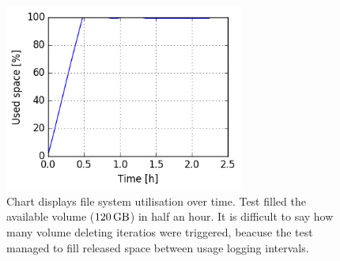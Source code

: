 \documentclass[
  color, %
  table, %
  lof,   %
  lot,   %
]{fithesis3}
\begin{document}
\begin{figure}[h]
    \begin{minipage}{\textwidth}
        \centering
        \includegraphics[width=0.7\textwidth]{../charts/SSD_ext4_trim/usage.png}
        \caption[Usage of available space of ext4 during testing on SSD with regular trimming]{Chart displays file system utilisation over time. Test filled the available volume ($\SI{120}{\giga\byte}$) in half an hour. It is difficult to say how many volume deleting iteratios were triggered, beacuse the test managed to fill released space between usage logging intervals.}
\label{fig:usage_ext4_ssd_trim}
    \end{minipage}
\end{figure}
\end{document}
